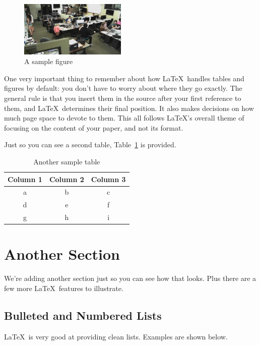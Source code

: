 \documentclass{article}
\begin{document}
\begin{figure}
\centering
\includegraphics[width=2in]{space.jpg} 

\caption{A sample figure}
\label{figure-sample}
\end{figure}

One very important thing to remember about how \LaTeX\ handles tables and figures by default: you don't have to worry about where they go exactly.  The general rule is that you insert them in the source after your first reference to them, and \LaTeX\ determines their final position.  It also makes decisions on how much page space to devote to them.  This all follows \LaTeX's overall theme of focusing on the content of your paper, and not its format.

Just so you can see a second table, Table~\ref{table-sample2} is provided.

\begin{table}
\centering
\begin{tabular}{|c|c|c|}\hline
Column 1 & Column 2 & Column 3 \\\hline\hline
a & b & c \\
d & e & f \\
g & h & i \\\hline
\end{tabular}

\caption{Another sample table}
\label{table-sample2}
\end{table}

\section{Another Section}

We're adding another section just so you can see how that looks.  Plus there are a few more \LaTeX\ features to illustrate.

\subsection{Bulleted and Numbered Lists}

\LaTeX\ is very good at providing clean lists.  Examples are shown below.
\end{document}
